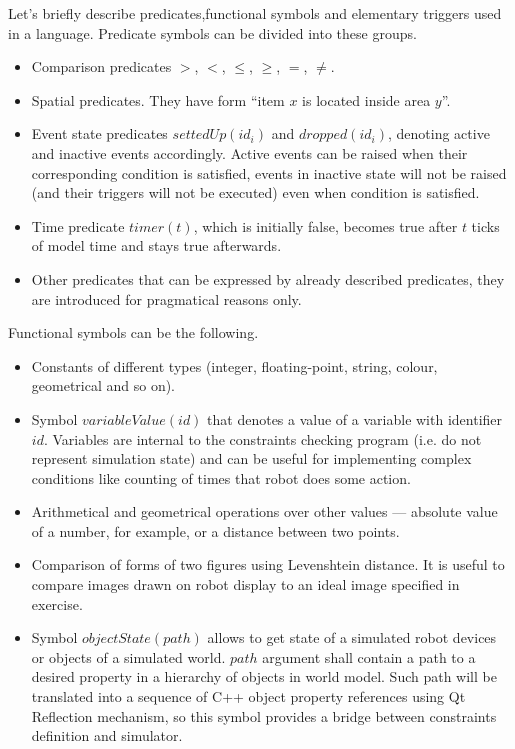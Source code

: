 \documentclass[conference]{IEEEtran}
\begin{document}
{Let's briefly describe predicates,functional symbols and elementary triggers used in a language. Predicate symbols can be divided into these groups.
\begin{itemize}
    \item Comparison predicates $>$, $<$, $\leq$, $\geq$, $=$, $\neq$.
    \item Spatial predicates. They have form "`item $x$ is located inside area $y$"'.
    \item Event state predicates $settedUp(id_i)$ and $dropped(id_i)$, denoting active and inactive events accordingly. Active events can be raised when their corresponding condition is satisfied, events in inactive state will not be raised (and their triggers will not be executed) even when condition is satisfied.
    \item Time predicate $timer(t)$, which is initially false, becomes true after $t$ ticks of model time and stays true afterwards.
    \item Other predicates that can be expressed by already described predicates, they are introduced for pragmatical reasons only.
\end{itemize}

Functional symbols can be the following.
\begin{itemize}
    \item Constants of different types (integer, floating-point, string, colour, geometrical and so on).
    \item Symbol $variableValue(id)$ that denotes a value of a variable with identifier $id$. Variables are internal to the constraints checking program (i.e. do not represent simulation state) and can be useful for implementing complex conditions like counting of times that robot does some action.
    \item Arithmetical and geometrical operations over other values --- absolute value of a number, for example, or a distance between two points.
    \item Comparison of forms of two figures using Levenshtein distance. It is useful to compare images drawn on robot display to an ideal image specified in exercise.
    \item Symbol $objectState(path)$ allows to get state of a simulated robot devices or objects of a simulated world. $path$ argument shall contain a path to a desired property in a hierarchy of objects in world model. Such path will be translated into a sequence of C++ object property references using Qt Reflection mechanism, so this symbol provides a bridge between constraints definition and simulator.
\end{itemize}

}
\end{document}
